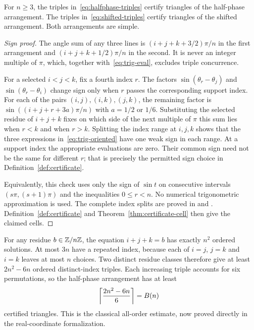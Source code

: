 \begin{lemma}\label{lem:trig-triangles}
For $n\ge3$, the triples in~\eqref{eq:halfphase-triples} certify triangles of the half-phase arrangement. The triples in~\eqref{eq:shifted-triples} certify triangles of the shifted arrangement. Both arrangements are simple.
\end{lemma}
\begin{proof}[Sign proof]
The angle sum of any three lines is $(i+j+k+3/2)\pi/n$ in the first arrangement and $(i+j+k+1/2)\pi/n$ in the second. It is never an integer multiple of $\pi$, which, together with~\eqref{eq:trig-eval}, excludes triple concurrence.

For a selected $i<j<k$, fix a fourth index $r$. The factors $\sin(\theta_r-\theta_j)$ and $\sin(\theta_r-\theta_i)$ change sign only when $r$ passes the corresponding support index. For each of the pairs $(i,j),(i,k),(j,k)$, the remaining factor is
$\sin((i+j+r+3a)\pi/n)$ with $a=1/2$ or $1/6$. Substituting the selected residue of $i+j+k$ fixes on which side of the next multiple of $\pi$ this sum lies when $r<k$ and when $r>k$. Splitting the index range at $i,j,k$ shows that the three expressions in~\eqref{eq:trig-oriented} have one weak sign in each range. At a support index the appropriate evaluations are zero. Their common sign need not be the same for different $r$; that is precisely the permitted sign choice in Definition~\ref{def:certificate}.

Equivalently, this check uses only the sign of $\sin t$ on consecutive intervals $(s\pi,(s+1)\pi)$ and the inequalities $0\le r<n$. No numerical trigonometric approximation is used. The complete index splits are proved in  and . Definition~\ref{def:certificate} and Theorem~\ref{thm:certificate-cell} then give the claimed cells.
\end{proof}

For any residue $b\in\mathbb{Z}/n\mathbb{Z}$, the equation $i+j+k=b$ has exactly $n^2$ ordered solutions. At most $3n$ have a repeated index, because each of $i=j$, $j=k$ and $i=k$ leaves at most $n$ choices. Two distinct residue classes therefore give at least $2n^2-6n$ ordered distinct-index triples. Each increasing triple accounts for six permutations, so the half-phase arrangement has at least
\begin{equation}\label{eq:classical-count}
\left\lceil\frac{2n^2-6n}{6}\right\rceil=B(n)
\end{equation}
certified triangles. This is the classical all-order estimate, now proved directly in the real-coordinate formalization.

